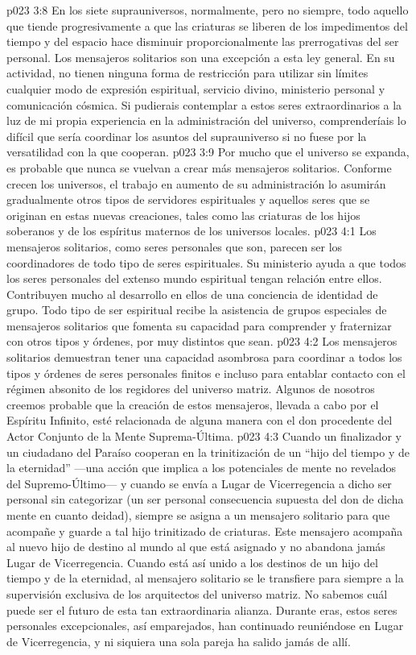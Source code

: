 \vs p023 3:8 En los siete suprauniversos, normalmente, pero no siempre, todo aquello que tiende progresivamente a que las criaturas se liberen de los impedimentos del tiempo y del espacio hace disminuir proporcionalmente las prerrogativas del ser personal. Los mensajeros solitarios son una excepción a esta ley general. En su actividad, no tienen ninguna forma de restricción para utilizar sin límites cualquier modo de expresión espiritual, servicio divino, ministerio personal y comunicación cósmica. Si pudierais contemplar a estos seres extraordinarios a la luz de mi propia experiencia en la administración del universo, comprenderíais lo difícil que sería coordinar los asuntos del suprauniverso si no fuese por la versatilidad con la que cooperan.
\vs p023 3:9 Por mucho que el universo se expanda, es probable que nunca se vuelvan a crear más mensajeros solitarios. Conforme crecen los universos, el trabajo en aumento de su administración lo asumirán gradualmente otros tipos de servidores espirituales y aquellos seres que se originan en estas nuevas creaciones, tales como las criaturas de los hijos soberanos y de los espíritus maternos de los universos locales.
\vs p023 4:1 Los mensajeros solitarios, como seres personales que son, parecen ser los coordinadores de todo tipo de seres espirituales. Su ministerio ayuda a que todos los seres personales del extenso mundo espiritual tengan relación entre ellos. Contribuyen mucho al desarrollo en ellos de una conciencia de identidad de grupo. Todo tipo de ser espiritual recibe la asistencia de grupos especiales de mensajeros solitarios que fomenta su capacidad para comprender y fraternizar con otros tipos y órdenes, por muy distintos que sean.
\vs p023 4:2 Los mensajeros solitarios demuestran tener una capacidad asombrosa para coordinar a todos los tipos y órdenes de seres personales finitos e incluso para entablar contacto con el régimen absonito de los regidores del universo matriz. Algunos de nosotros creemos probable que la creación de estos mensajeros, llevada a cabo por el Espíritu Infinito, esté relacionada de alguna manera con el don procedente del Actor Conjunto de la Mente Suprema\hyp{}Última.
\vs p023 4:3 \pc Cuando un finalizador y un ciudadano del Paraíso cooperan en la trinitización de un “hijo del tiempo y de la eternidad” ---una acción que implica a los potenciales de mente no revelados del Supremo\hyp{}Último--- y cuando se envía a Lugar de Vicerregencia a dicho ser personal sin categorizar (un ser personal consecuencia supuesta del don de dicha mente en cuanto deidad), siempre se asigna a un mensajero solitario para que acompañe y guarde a tal hijo trinitizado de criaturas. Este mensajero acompaña al nuevo hijo de destino al mundo al que está asignado y no abandona jamás Lugar de Vicerregencia. Cuando está así unido a los destinos de un hijo del tiempo y de la eternidad, al mensajero solitario se le transfiere para siempre a la supervisión exclusiva de los arquitectos del universo matriz. No sabemos cuál puede ser el futuro de esta tan extraordinaria alianza. Durante eras, estos seres personales excepcionales, así emparejados, han continuado reuniéndose en Lugar de Vicerregencia, y ni siquiera una sola pareja ha salido jamás de allí.
